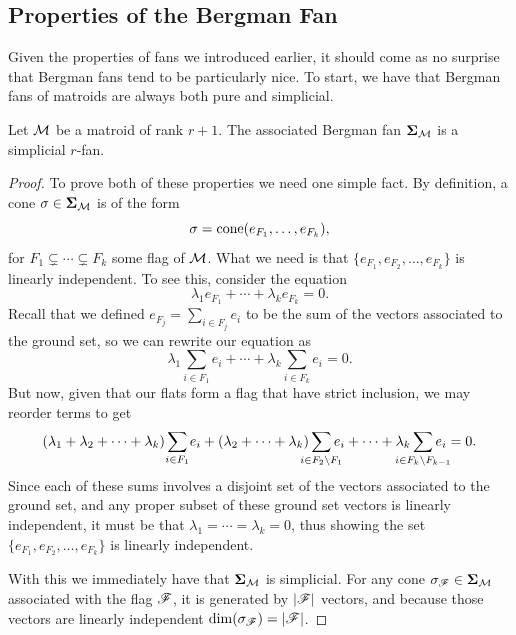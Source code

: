 \documentclass[12pt,oneside]{../../sfsuthesis}
\begin{document}
\subsection{Properties of the Bergman Fan}
Given the properties of fans we introduced earlier, it should come as no surprise that Bergman fans tend to be particularly nice.
To start, we have that Bergman fans of matroids are always both pure and simplicial.
\begin{proposition}\th\label{thm:bergFanSimPure}
    Let \( \mathcal{M} \) be a matroid of rank \( r + 1 \).
    The associated Bergman fan \( {\bm{\Sigma}}_{\mathcal{M}} \) is a simplicial \( r \)-fan.
\end{proposition}
\begin{proof}
    To prove both of these properties we need one simple fact.
    By definition, a cone \( \sigma \in {\bm{\Sigma}}_{\mathcal{M}} \) is of the form
    \[
        \sigma = \mathrm{cone}( e_{F_1}, \dots, e_{F_k} ),
    \]
    for \( F_1 \subsetneq \cdots \subsetneq F_k \) some flag of \( \mathcal{M} \).
    What we need is that \( \{e_{F_1}, e_{F_2}, \dots, e_{F_k} \} \) is linearly independent.
    To see this, consider the equation
    \[
        \lambda_{1}e_{F_1} + \cdots + \lambda_{k}e_{F_{k}} = 0.
    \]
    Recall that we defined \( e_{F_j} = \sum_{i \in F_{j} } e_i \) to be the sum of the vectors associated to the ground set, so we can rewrite our equation as
    \[
        \lambda_{1}\sum_{i \in F_{1} } e_i + \cdots + \lambda_{k}\sum_{i \in F_{k} } e_i = 0.
    \]
    But now, given that our flats form a flag that have strict inclusion, we may reorder terms to get
    \[
        (\lambda_1 + \lambda_2 + \cdots + \lambda_k) \sum_{\mathclap{i \in F_1}} e_i
        + (\lambda_2 + \cdots + \lambda_k) \sum_{\mathclap{i \in F_2 \setminus F_1}} e_i
        + \cdots
        + \lambda_k \sum_{\mathclap{i \in F_k \setminus F_{k-1}}} e_i  = 0.
    \]
    Since each of these sums involves a disjoint set of the vectors associated to the ground set, and any proper subset of these ground set vectors is linearly independent, it must be that \( \lambda_1 = \cdots = \lambda_k = 0 \), thus showing the set \( \{e_{F_1}, e_{F_2}, \dots, e_{F_k} \} \) is linearly independent.

    With this we immediately have that \( {\bm{\Sigma}}_{\mathcal{M}} \) is simplicial.
    For any cone \( \sigma_{\mathscr{F}} \in {\bm{\Sigma}}_{\mathcal{M}} \) associated with the flag \( \mathscr{F} \), it is generated by \( |\mathscr{F}| \) vectors, and because those vectors are linearly independent \( \dim(\sigma_{\mathscr{F}}) = |\mathscr{F}| \).


\end{proof}
\end{document}
